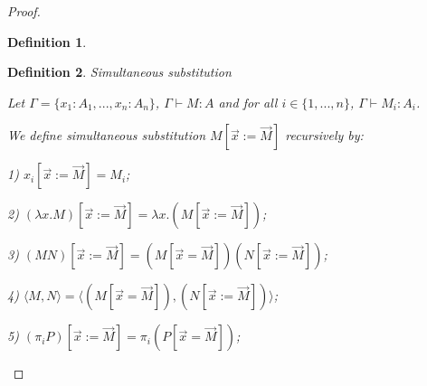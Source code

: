 \documentclass[a4paper]{article}
\newtheorem{defin}{Definition}
\begin{document}
\begin{proof}
\begin{defin}
\begin{prooftree}
\end{prooftree}

\begin{prooftree}
\end{prooftree}

  \begin{prooftree}
  \end{prooftree}

\end{defin}

\begin{defin} Simultaneous substitution

Let $\Gamma = \{ x_1 : A_1, ..., x_n : A_n \}$, $\Gamma \vdash M : A$ and for all $i \in \{ 1,..., n \}$,
$\Gamma \vdash M_i : A_i$.

We define simultaneous substitution $M [ \vec{x} := \vec{M}]$ recursively by:

1) $x_i [ \vec{x} := \vec{M}] = M_i $;

2) $(\lambda x. M) [ \vec{x} := \vec{M}] = \lambda x. (M [ \vec{x} := \vec{M}])$;

3) $(M N) [ \vec{x} := \vec{M}] = (M [ \vec{x} = \vec{M}]) (N [ \vec{x} := \vec{M}])$;

4) $\langle M, N \rangle = \langle (M [ \vec{x} = \vec{M}]), (N [ \vec{x} := \vec{M}])\rangle$;

5) $(\pi_i P) [ \vec{x} := \vec{M}] = \pi_i (P [ \vec{x} = \vec{M}])$;


\end{defin}
\end{proof}
\end{document}
